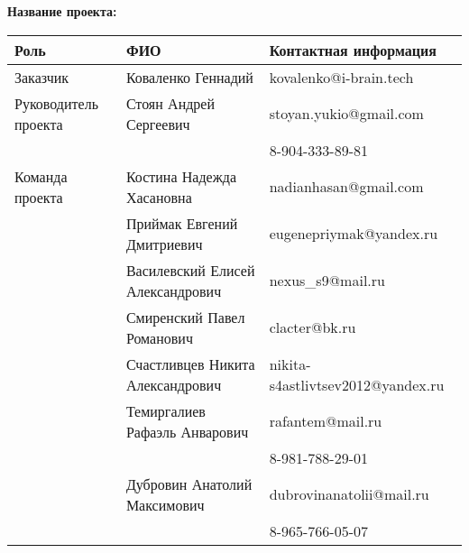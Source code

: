 \documentclass[a4paper,12pt]{article}
\begin{document}
\textbf{Название проекта: }

\vspace{5ex}


\begin{tabular}{|l|l|l|}
    \hline
    \textbf{Роль} & \textbf{ФИО} & \textbf{Контактная информация} \\
    \hline 
    Заказчик & Коваленко Геннадий & kovalenko@i-brain.tech \\
    \hline
    Руководитель проекта & Стоян Андрей Сергеевич 
       & stoyan.yukio@gmail.com \\ 
     & & 8-904-333-89-81 \\ 
    \hline
    Команда проекта 
     & Костина Надежда Хасановна & nadianhasan@gmail.com \\ \cline{2-3}
     & Приймак Евгений Дмитриевич & eugenepriymak@yandex.ru \\ \cline{2-3}
     & Василевский Елисей Александрович & nexus\_s9@mail.ru \\ \cline{2-3}
     & Смиренский Павел Романович & clacter@bk.ru \\ \cline{2-3}
     & Счастливцев Никита Александрович & nikita-s4astlivtsev2012@yandex.ru \\ \cline{2-3}
     & Темиргалиев Рафаэль Анварович & rafantem@mail.ru \\
     & & 8-981-788-29-01 \\ \cline{2-3}
     & Дубровин Анатолий Максимович & dubrovinanatolii@mail.ru \\ 
     & & 8-965-766-05-07 \\
    \hline
\end{tabular}
\end{document}
